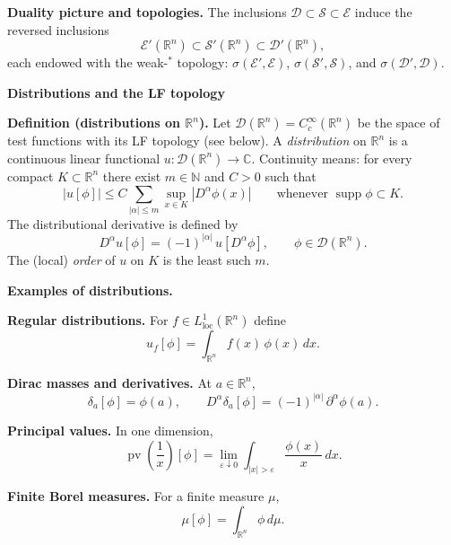 \begin{problem}[CP-III-0024]
\bigskip

\par\smallskip\noindent\textbf{Duality picture and topologies.}\quad
The inclusions $\mathcal D\subset\mathcal S\subset\mathcal E$ induce the reversed inclusions
\[
\mathcal E'(\mathbb R^n)\subset \mathcal S'(\mathbb R^n)\subset \mathcal D'(\mathbb R^n),
\]
each endowed with the weak-$^\ast$ topology:
$\sigma(\mathcal E',\mathcal E)$, $\sigma(\mathcal S',\mathcal S)$, and $\sigma(\mathcal D',\mathcal D)$.


\par\medskip\noindent\textbf{Distributions and the LF topology}\quad

\par\smallskip\noindent\textbf{Definition (distributions on $\mathbb R^n$).}\quad
Let $\mathcal D(\mathbb R^n)=C_c^\infty(\mathbb R^n)$ be the space of test functions with its LF topology (see below).
A \emph{distribution} on $\mathbb R^n$ is a continuous linear functional $u:\mathcal D(\mathbb R^n)\to\mathbb C$.
Continuity means: for every compact $K\subset\mathbb R^n$ there exist $m\in\mathbb N$ and $C>0$ such that
\[
|u[\phi]|\le C \sum_{|\alpha|\le m}\sup_{x\in K}|D^\alpha\phi(x)|
\qquad\text{whenever }\operatorname{supp}\phi\subset K.
\]
The distributional derivative is defined by
\[
D^\alpha u[\phi]=(-1)^{|\alpha|}\,u[D^\alpha\phi],\qquad \phi\in\mathcal D(\mathbb R^n).
\]
The (local) \emph{order} of $u$ on $K$ is the least such $m$.

\bigskip

\par\smallskip\noindent\textbf{Examples of distributions.}\quad

\bigskip

\textbf{Regular distributions.}
For $f\in L^1_{\mathrm{loc}}(\mathbb R^n)$ define
\[
u_f[\phi]=\int_{\mathbb R^n} f(x)\,\phi(x)\,dx .
\]

\medskip

\textbf{Dirac masses and derivatives.}
At $a\in\mathbb R^n$,
\[
\delta_a[\phi]=\phi(a),
\qquad
D^\alpha\delta_a[\phi]=(-1)^{|\alpha|}\,\partial^\alpha\phi(a).
\]

\medskip

\textbf{Principal values.}
In one dimension,
\[
\operatorname{pv}\!\left(\frac{1}{x}\right)[\phi]
=\lim_{\varepsilon\downarrow0}\int_{|x|>\varepsilon}\frac{\phi(x)}{x}\,dx .
\]

\medskip

\textbf{Finite Borel measures.}
For a finite measure $\mu$,
\[
\mu[\phi]=\int_{\mathbb R^n}\phi\,d\mu .
\]


\end{problem}
